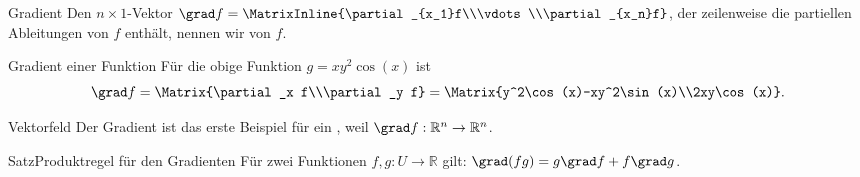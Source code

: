 \begin{Def}
{Gradient}
Den $n\times 1$-Vektor $\grad f=\MatrixInline{\partial_{x_1}f\\\vdots\\\partial_{x_n}f}$, der zeilenweise die partiellen Ableitungen von $f$ enthält, nennen wir  von $f$.
\end{Def}
\begin{Beispiel}
{Gradient einer Funktion}
Für die obige Funktion $g=xy^2\cos(x)$ ist
\begin{equation*}
    \grad f=\Matrix{\partial_x f\\\partial_y f}=\Matrix{y^2\cos(x)-xy^2\sin(x)\\2xy\cos(x)}.
\end{equation*}
\end{Beispiel}
\begin{Def}
{Vektorfeld}
Der Gradient ist das erste Beispiel für ein , weil $\grad f:\mathbb{R}^n\to\mathbb{R}^n$.
\end{Def}
\begin{Satz}
{Satz}{Produktregel für den Gradienten}
Für zwei Funktionen $f,g:U\to \mathbb{R}$ gilt: $\grad(f g)=g\grad f+f\grad g$.
\end{Satz}
